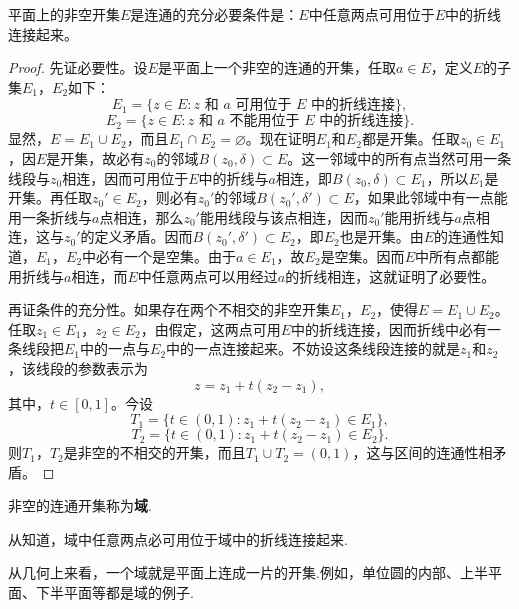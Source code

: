 \documentclass[../../main.tex]{subfiles}
\begin{document}
\begin{theorem}\label{theorem:连通集合的性质}
平面上的非空开集\(E\)是连通的充分必要条件是：\(E\)中任意两点可用位于\(E\)中的折线连接起来。
\end{theorem}
\begin{proof}
先证必要性。设\(E\)是平面上一个非空的连通的开集，任取\(a \in E\)，定义\(E\)的子集\(E_1\)，\(E_2\)如下：
\[
E_1 = \{ z \in E : z \text{ 和 } a \text{ 可用位于 } E \text{ 中的折线连接} \},
\]
\[
E_2 = \{ z \in E : z \text{ 和 } a \text{ 不能用位于 } E \text{ 中的折线连接} \}.
\]
显然，\(E = E_1 \cup E_2\)，而且\(E_1 \cap E_2 = \varnothing\)。现在证明\(E_1\)和\(E_2\)都是开集。任取\(z_0 \in E_1\)，因\(E\)是开集，故必有\(z_0\)的邻域\(B(z_0, \delta) \subset E\)。这一邻域中的所有点当然可用一条线段与\(z_0\)相连，因而可用位于\(E\)中的折线与\(a\)相连，即\(B(z_0, \delta) \subset E_1\)，所以\(E_1\)是开集。再任取\(z_0' \in E_2\)，则必有\(z_0'\)的邻域\(B(z_0', \delta') \subset E\)，如果此邻域中有一点能用一条折线与\(a\)点相连，那么\(z_0'\)能用线段与该点相连，因而\(z_0'\)能用折线与\(a\)点相连，这与\(z_0'\)的定义矛盾。因而\(B(z_0', \delta') \subset E_2\)，即\(E_2\)也是开集。由\(E\)的连通性知道，\(E_1\)，\(E_2\)中必有一个是空集。由于\(a \in E_1\)，故\(E_2\)是空集。因而\(E\)中所有点都能用折线与\(a\)相连，而\(E\)中任意两点可以用经过\(a\)的折线相连，这就证明了必要性。

再证条件的充分性。如果存在两个不相交的非空开集\(E_1\)，\(E_2\)，使得\(E = E_1 \cup E_2\)。任取\(z_1 \in E_1\)，\(z_2 \in E_2\)，由假定，这两点可用\(E\)中的折线连接，因而折线中必有一条线段把\(E_1\)中的一点与\(E_2\)中的一点连接起来。不妨设这条线段连接的就是\(z_1\)和\(z_2\)，该线段的参数表示为
\[
z = z_1 + t(z_2 - z_1),
\]
其中，\(t \in [0, 1]\)。今设
\[
T_1 = \{ t \in (0, 1) : z_1 + t(z_2 - z_1) \in E_1 \},
\]
\[
T_2 = \{ t \in (0, 1) : z_1 + t(z_2 - z_1) \in E_2 \}.
\]
则\(T_1\)，\(T_2\)是非空的不相交的开集，而且\(T_1 \cup T_2 = (0, 1)\)，这与区间的连通性相矛盾。 

\end{proof}

\begin{definition}
非空的连通开集称为\textbf{域}.
\end{definition}
\begin{note}
从知道，域中任意两点必可用位于域中的折线连接起来.

从几何上来看，一个域就是平面上连成一片的开集.例如，单位圆的内部、上半平面、下半平面等都是域的例子.
\end{note}
\end{document}
